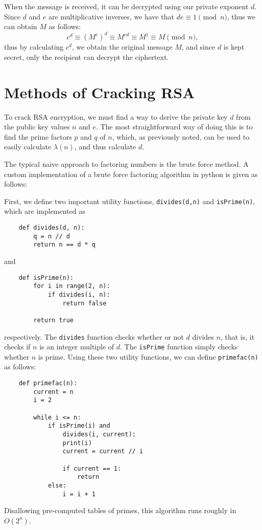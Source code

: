 \documentclass[letterpaper,twocolumn,12pt]{article}
\begin{document}
    When the message is received, it can be decrypted using our private
    exponent \( d \).
    Since \( d \) and \( e \) are multiplicative inverses, we have that
    \( de \equiv 1 \pmod{n} \), thus we can obtain \( M \) as follows:
    \[ c^d \equiv (M^e)^d \equiv M^{ed} \equiv M^1 \equiv M \pmod{n}, \]
    thus by calculating \( c^d \), we obtain the original message \( M \),
    and since \( d \) is kept secret, only the recipient can decrypt the
    ciphertext.

    \section*{Methods of Cracking RSA}

    To crack RSA encryption, we must find a way to derive the private key
    \( d \) from the public key values \( n \) and \( e \).
    The most straightforward way of doing this is to find the prime factors
    \( p \) and \( q \) of \( n \), which, as previously noted, can be used to
    easily calculate \( \lambda(n) \), and thus calculate \( d \).
    
    The typical naive approach to factoring numbers is the brute force method.
    A custom implementation of a brute force factoring algorithm in python is
    given as follows:

    First, we define two important utility functions, \verb|divides(d,n)| and
    \verb|isPrime(n)|, which are implemented as
    \begin{verbatim}
    def divides(d, n):
        q = n // d
        return n == d * q
    \end{verbatim}
    and
    \begin{verbatim}
    def isPrime(n):
        for i in range(2, n):
            if divides(i, n):
                return false
        
        return true
    \end{verbatim}
    respectively.
    The \verb|divides| function checks whether or not \( d \) divides \( n \),
    that is, it checks if \( n \) is an integer multiple of \( d \).
    The \verb|isPrime| function simply checks whether \( n \) is prime.
    Using these two utility functions, we can define \verb|primefac(n)|
    as follows:
    \begin{verbatim}
    def primefac(n):
        current = n
        i = 2

        while i <= n:
            if isPrime(i) and
                divides(i, current):
                print(i)
                current = current // i

                if current == 1:
                    return
            else:
                i = i + 1
    \end{verbatim}
    Disallowing pre-computed tables of primes, this algorithm runs roughly in
    \( O(2^n) \).
\end{document}
